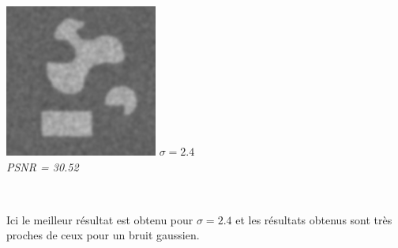 \documentclass[a4,12pt]{article}
\begin{document}
\begin{center}
\begin{minipage}[c]{0.30\linewidth}
		\begin{center}
			\includegraphics[width = 50mm]{./img/2sp1-2_4.jpg}
			\textit{$\sigma = 2.4$}\\
			\textit{PSNR = 30.52}
		\end{center}
	\end{minipage}\\
\end{center}

Ici le meilleur résultat est obtenu pour $\sigma=2.4$ et les résultats obtenus sont très proches de ceux pour un bruit gaussien.
\end{document}
